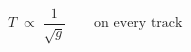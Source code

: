 \documentclass[preview,border=2pt]{standalone}
\begin{document}
$T \;\propto\; \dfrac{1}{\sqrt{g}}\qquad\text{on every track}$
\end{document}
